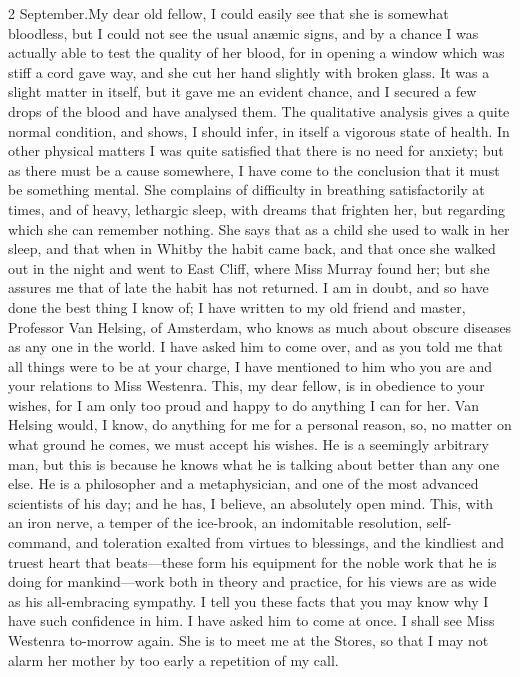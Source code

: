 \begin{mail}{2 September.}{My dear old fellow,}
I could easily see that she is somewhat bloodless, but I could not see the usual anæmic signs, and by a chance I was actually able to test the quality of her blood, for in opening a window which was stiff a cord gave way, and she cut her hand slightly with broken glass. It was a slight matter in itself, but it gave me an evident chance, and I secured a few drops of the blood and have analysed them. The qualitative analysis gives a quite normal condition, and shows, I should infer, in itself a vigorous state of health. In other physical matters I was quite satisfied that there is no need for anxiety; but as there must be a cause somewhere, I have come to the conclusion that it must be something mental. She complains of difficulty in breathing satisfactorily at times, and of heavy, lethargic sleep, with dreams that frighten her, but regarding which she can remember nothing. She says that as a child she used to walk in her sleep, and that when in Whitby the habit came back, and that once she walked out in the night and went to East Cliff, where Miss Murray found her; but she assures me that of late the habit has not returned. I am in doubt, and so have done the best thing I know of; I have written to my old friend and master, Professor Van Helsing, of Amsterdam, who knows as much about obscure diseases as any one in the world. I have asked him to come over, and as you told me that all things were to be at your charge, I have mentioned to him who you are and your relations to Miss Westenra. This, my dear fellow, is in obedience to your wishes, for I am only too proud and happy to do anything I can for her. Van Helsing would, I know, do anything for me for a personal reason, so, no matter on what ground he comes, we must accept his wishes. He is a seemingly arbitrary man, but this is because he knows what he is talking about better than any one else. He is a philosopher and a metaphysician, and one of the most advanced scientists of his day; and he has, I believe, an absolutely open mind. This, with an iron nerve, a temper of the ice-brook, an indomitable resolution, self-command, and toleration exalted from virtues to blessings, and the kindliest and truest heart that beats—these form his equipment for the noble work that he is doing for mankind—work both in theory and practice, for his views are as wide as his all-embracing sympathy. I tell you these facts that you may know why I have such confidence in him. I have asked him to come at once. I shall see Miss Westenra to-morrow again. She is to meet me at the Stores, so that I may not alarm her mother by too early a repetition of my call.

\end{mail}

